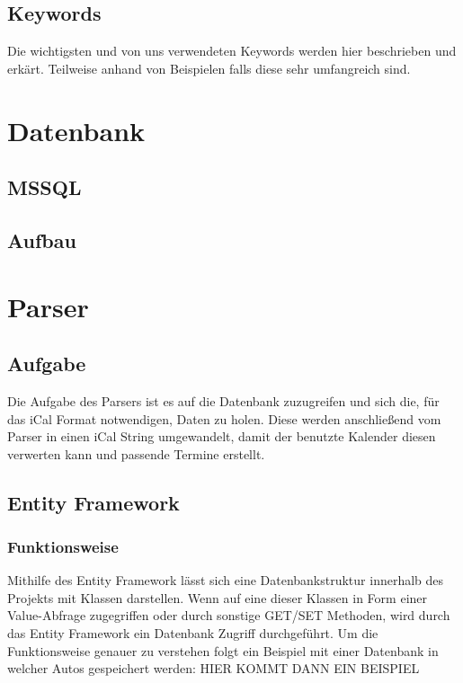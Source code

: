 \documentclass[12pt]{scrartcl}
\begin{document}
\subsection{Keywords}
\label{sec:ical-keywords}
Die wichtigsten und von uns verwendeten Keywords werden hier beschrieben und erkärt. Teilweise anhand von Beispielen falls diese sehr umfangreich sind. 


\section{Datenbank}
\label{sec:datenbank}
\subsection{MSSQL}
\label{sec:db-mssql}
\subsection{Aufbau}
\label{sec:db-aufbau}

\section{Parser}
\label{sec:parser}
\subsection{Aufgabe}
\label{sec:parser-aufgabe}
Die Aufgabe des Parsers ist es auf die Datenbank zuzugreifen und sich die, für das iCal Format notwendigen, Daten zu holen. Diese werden anschließend vom Parser in einen iCal String umgewandelt, damit der benutzte Kalender diesen verwerten kann und passende Termine erstellt. 

\subsection{Entity Framework}
\label{sec:parser-entity-framework}
\subsubsection {Funktionsweise}
Mithilfe des Entity Framework lässt sich eine Datenbankstruktur innerhalb des Projekts mit Klassen darstellen. Wenn auf eine dieser Klassen in Form einer Value-Abfrage zugegriffen oder durch sonstige GET/SET Methoden, wird durch das Entity Framework ein Datenbank Zugriff durchgeführt. 
Um die Funktionsweise genauer zu verstehen folgt ein Beispiel mit einer Datenbank in welcher Autos gespeichert werden:
HIER KOMMT DANN EIN BEISPIEL
\end{document}
